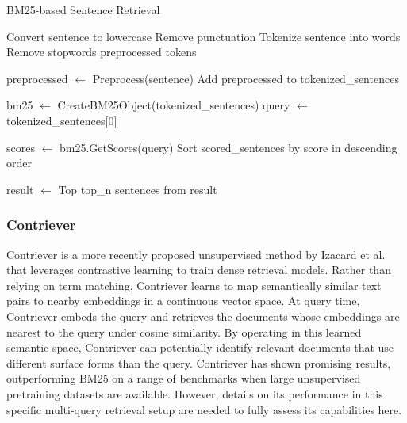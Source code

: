 \begin{algorithm}
    \caption{BM25-based Sentence Retrieval}
    \begin{algorithmic}[1]
            \State Convert sentence to lowercase
            \State Remove punctuation
            \State Tokenize sentence into words
            \State Remove stopwords
            \State \Return preprocessed tokens
        \EndProcedure

                \State preprocessed $\gets$ Preprocess(sentence)
                \State Add preprocessed to tokenized\_sentences
            \EndFor

            \State bm25 $\gets$ CreateBM25Object(tokenized\_sentences)
            \State query $\gets$ tokenized\_sentences[0]

            \State scores $\gets$ bm25.GetScores(query)
            \State Sort scored\_sentences by score in descending order

            \State result $\gets$ Top top\_n sentences from result

        \EndProcedure
    \end{algorithmic}
\end{algorithm}

\subsubsection{Contriever}
Contriever is a more recently proposed unsupervised method by Izacard et al.\cite{izacard2022unsuperviseddenseinformationretrieval} that leverages contrastive learning to train dense retrieval models.
Rather than relying on term matching, Contriever learns to map semantically similar text pairs to nearby embeddings in a continuous vector space.
At query time, Contriever embeds the query and retrieves the documents whose embeddings are nearest to the query under cosine similarity.
By operating in this learned semantic space, Contriever can potentially identify relevant documents that use different surface forms than the query.
Contriever has shown promising results, outperforming BM25 on a range of benchmarks when large unsupervised pretraining datasets are available.
However, details on its performance in this specific multi-query retrieval setup are needed to fully assess its capabilities here.

